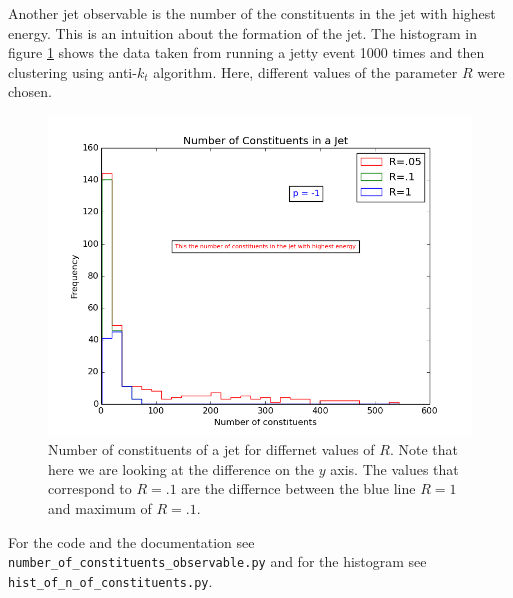 Another jet observable is the number of the constituents in the jet with highest energy.  This is an intuition about the formation of the jet. The histogram in figure \ref{nofcon} shows the data taken from running a jetty event 1000 times and then clustering  using anti-$k_t$ algorithm. Here, different values of the parameter $R$ were chosen.
\begin{figure}[hbtp]
\centering
\includegraphics[scale=.6]{images/n_of_con_obs.png}
\caption{Number of constituents of a jet for differnet  values of $R$.  Note that here we are looking at the difference on the $y$ axis. The values that correspond to $R = .1$ are the differnce between the blue line $R = 1$ and maximum of $R = .1$.}\label{nofcon}
\end{figure}

For the code and the documentation see
\verb+number_of_constituents_observable.py+ and for the histogram see \verb+hist_of_n_of_constituents.py+.               

